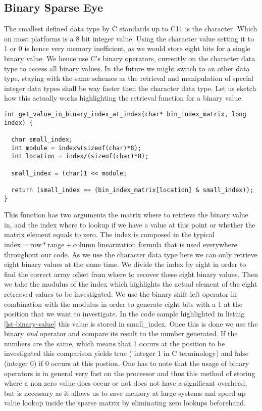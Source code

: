 \subsection{Binary Sparse Eye}

The smallest defined data type by C standards up to C11 is the
character. Which on most platforms is a 8 bit integer value. Using
the character value setting it to 1 or 0 is hence very memory
inefficient, as we would store eight bits for a single binary
value. We hence use C's binary operators, currently on the character
data type to access all binary values. In the future we might switch
to an other data type, staying with the same schemes as the retrieval
and manipulation of special integer data types shall be way faster
then the character data type. Let us sketch how this actually works
highlighting the retrieval function for a binary value.
\begin{lstlisting}
int get_value_in_binary_index_at_index(char* bin_index_matrix, long index) {

  char small_index;
  int module = index%(sizeof(char)*8);
  int location = index/(sizeof(char)*8);

  small_index = (char)1 << module;

  return (small_index == (bin_index_matrix[location] & small_index));
}
\end{lstlisting}
This function has two arguments the matrix where to retrieve the
binary value in, and the index where to lookup if we have a value at
this point or whether the matrix element equals to zero. The index is
composed in the typical
$\mathrm{index}=\mathrm{row}*\mathrm{range}+\mathrm{column}$
linearization formula that is used everywhere throughout our code. As
we use the character data type here we can only retrieve eight binary
values at the same time. We divide the index by eight in order to find
the correct array offset from where to recover these eight binary
values. Then we take the modulus of the index which highlights the actual
element of the eight retreaved values to be investigated. We use
the binary shift left operator in combination with the modulus in
order to generate eight bits with a 1 at the position that we want to
investigate. In the code sample highlighted in listing
\ref{lst-binary-value} this value is stored in small\_index. Once this
is done we use the binary \emph{and} operator and compare its result
to the number generated. If the numbers are the same, which means
that 1 occurs at the position to be investigated this comparison yields true (
integer 1 in C terminology) and false (integer 0) if 0 occurs at this
postion. One has to note that the usage of binary operators is in
general very fast on the processor and thus this method of storing
where a non zero value does occur or not does not have a significant overhead,
but is necessary as it allows us to save 
memory at large systems and speed up value lookup inside the sparse
matrix by eliminating zero lookups beforehand. 

